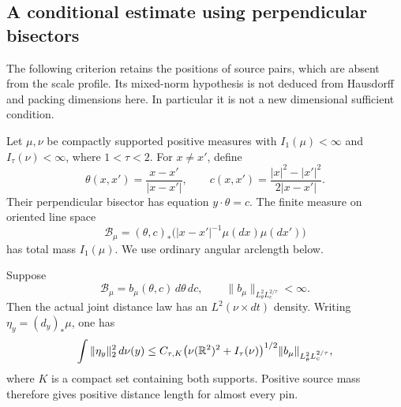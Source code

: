 \subsection{A conditional estimate using perpendicular bisectors}
\label{bisector:section}

The following criterion retains the positions of source pairs, which are
absent from the scale profile. Its mixed-norm hypothesis is not deduced
from Hausdorff and packing dimensions here. In particular it is not a new
dimensional sufficient condition.

Let \(\mu,\nu\) be compactly supported positive measures with
\(I_1(\mu)<\infty\) and \(I_\tau(\nu)<\infty\), where
\(1<\tau<2\). For \(x\ne x'\), define
\[
 \theta(x,x')=\frac{x-x'}{|x-x'|},\qquad
 c(x,x')=\frac{|x|^2-|x'|^2}{2|x-x'|}.
\]
Their perpendicular bisector has equation \(y\cdot\theta=c\).
The finite measure on oriented line space
\[
 \mathcal B_\mu=(\theta,c)_*
       \bigl(|x-x'|^{-1}\mu(dx)\mu(dx')\bigr)
\]
has total mass \(I_1(\mu)\). We use ordinary angular arclength below.

\begin{proposition}\label{bisector:criterion}
Suppose
\[
 \mathcal B_\mu=b_\mu(\theta,c)\,d\theta\,dc,\qquad
 \|b_\mu\|_{L^2_\theta L^{2/\tau}_c}<\infty.
\]
Then the actual joint distance law has an \(L^2(\nu\times dt)\)
density. Writing \(\eta_y=(d_y)_*\mu\), one has
\begin{equation}\label{bisector:bound}
 \int\|\eta_y\|_2^2\,d\nu(y)
 \le C_{\tau,K}
   \bigl(\nu(\mathbb R^2)^2+I_\tau(\nu)\bigr)^{1/2}
   \|b_\mu\|_{L^2_\theta L^{2/\tau}_c},
\end{equation}
where \(K\) is a compact set containing both supports. Positive source
mass therefore gives positive distance length for almost every pin.
\end{proposition}

